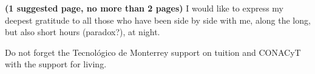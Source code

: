 \textbf{(1 suggested page,  no more than 2 pages)} I would like to express my deepest gratitude to all those who have been side by side with me, along the long, but also short hours (paradox?), at night.

Do not forget the Tecnol\'{o}gico de Monterrey support on tuition and CONACyT with the support for living.
